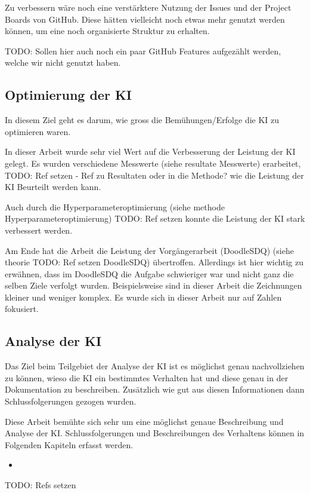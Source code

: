 Zu verbessern wäre noch eine verstärktere Nutzung der Issues und der Project
Boards von GitHub. Diese hätten vielleicht noch etwas mehr genutzt werden
können, um eine noch organisierte Struktur zu erhalten.

TODO: Sollen hier auch noch ein paar GitHub Features aufgezählt werden, welche wir nicht genutzt haben.


\subsection*{Optimierung der KI}
In diesem Ziel geht es darum, wie gross die Bemühungen/Erfolge die KI zu
optimieren waren.

In dieser Arbeit wurde sehr viel Wert auf die Verbesserung der Leistung der KI
gelegt. Es wurden verschiedene Messwerte (siehe resultate Messwerte) erarbeitet,  TODO: Ref setzen - Ref zu Resultaten oder in die Methode?
wie die Leistung der KI Beurteilt werden kann.

Auch durch die Hyperparameteroptimierung (siehe methode Hyperparameteroptimierung) TODO: Ref setzen
konnte die Leistung der KI stark verbessert werden.

Am Ende hat die Arbeit die Leistung der Vorgängerarbeit (DoodleSDQ) (siehe theorie  TODO: Ref setzen
DoodleSDQ) übertroffen. Allerdings ist hier wichtig zu erwähnen, dass im
DoodleSDQ die Aufgabe schwieriger war und nicht ganz die selben Ziele verfolgt
wurden. Beispielsweise sind in dieser Arbeit die Zeichnungen kleiner und weniger
komplex. Es wurde sich in dieser Arbeit nur auf Zahlen fokusiert.


\subsection*{Analyse der KI}
Das Ziel beim Teilgebiet der Analyse der KI ist es möglichst genau
nachvollziehen zu können, wieso die KI ein bestimmtes Verhalten hat und diese
genau in der Dokumentation zu beschreiben. Zusätzlich wie gut aus diesen
Informationen dann Schlussfolgerungen gezogen wurden.

Diese Arbeit bemühte sich sehr um eine möglichst genaue Beschreibung und Analyse
der KI. Schlussfolgerungen und Beschreibungen des Verhaltens können in Folgenden Kapiteln erfasst werden.

\begin{itemize}
    \item 
\end{itemize}
TODO: Refs setzen
